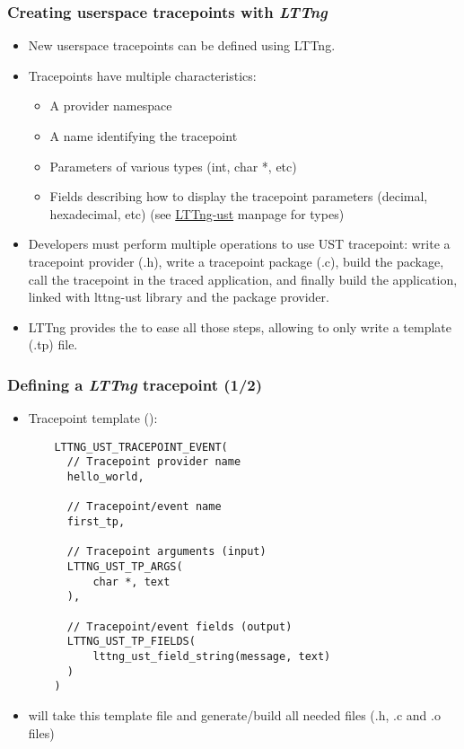 \begin{frame}
  \frametitle{Creating userspace tracepoints with {\em LTTng}}
  \begin{itemize}
    \item New userspace tracepoints can be defined using LTTng.
    \item Tracepoints have multiple characteristics:
    \begin{itemize}
      \item A provider namespace
      \item A name identifying the tracepoint
      \item Parameters of various types (int, char *, etc)
      \item Fields describing how to display the tracepoint parameters
            (decimal, hexadecimal, etc) (see \href{https://lttng.org/man/3/lttng-ust/v2.13/}{LTTng-ust} manpage
            for types)
    \end{itemize}
    \item Developers must perform multiple operations to use UST tracepoint:
    write a tracepoint provider (.h), write a tracepoint package (.c), build
    the package, call the tracepoint in the traced application, and finally
    build the application, linked with lttng-ust library and the package provider.
    \item LTTng provides the  to ease all those steps,
    allowing to only write a template (.tp) file.
  \end{itemize}
\end{frame}

\begin{frame}[fragile]
  \frametitle{Defining a {\em LTTng} tracepoint (1/2)}

  \begin{itemize}
    \item Tracepoint template ():
    \begin{block}{}
      \begin{verbatim}
    LTTNG_UST_TRACEPOINT_EVENT(
      // Tracepoint provider name
      hello_world,

      // Tracepoint/event name
      first_tp,

      // Tracepoint arguments (input)
      LTTNG_UST_TP_ARGS(
          char *, text
      ),

      // Tracepoint/event fields (output)
      LTTNG_UST_TP_FIELDS(
          lttng_ust_field_string(message, text)
      )
    )
     \end{verbatim}
    \end{block}
    \item {} will take this template file and generate/build
    all needed files (.h, .c and .o files)
  \end{itemize}
\end{frame}

